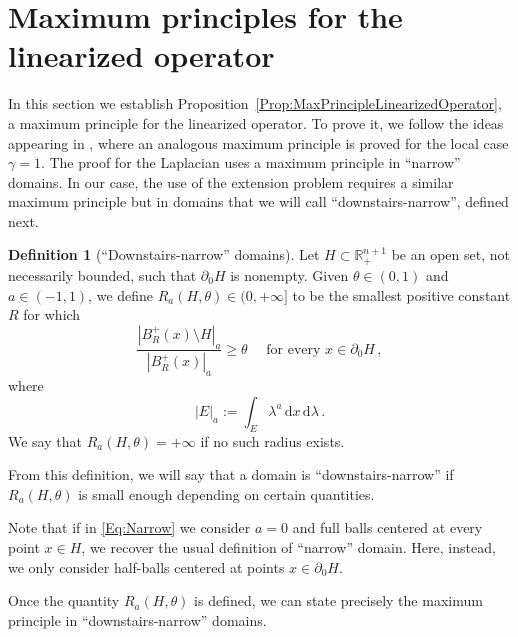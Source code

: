 \documentclass[12pt,reqno]{amsart}
\theoremstyle{definition}
\newtheorem{definition}[theorem]{Definition}
\theoremstyle{remark}
\newcommand{\con}[1]{\mathbb{#1}}
\newcommand{\R}{\con{R}} %
\newcommand{\s}{\gamma}
\renewcommand{\d}{\,\mathrm{d}} %
\newcommand{\dx}{\,\mathrm{d}x} %
\numberwithin{equation}{section}
\begin{document}
\section{Maximum principles for the linearized operator}
\label{Sec:MaximumPrinciple}

In this section we establish Proposition~\ref{Prop:MaxPrincipleLinearizedOperator}, a maximum principle for the linearized operator. To prove it, we follow the ideas appearing in \cite{Cabre-Saddle}, where an analogous maximum principle is proved for the local case $\s = 1$. The proof for the Laplacian uses a maximum principle in ``narrow'' domains. In our case, the use of the extension problem requires a similar maximum principle but in domains that we will call ``downstairs-narrow''\!, defined next.

\begin{definition}[``Downstairs-narrow'' domains]
Let $H \subset \R^{n+1}_+$ be an open set, not necessarily bounded, such that $\partial_0 H$ is nonempty. Given $\theta \in (0,1)$ and $a\in (-1,1)$, we define $R_a(H,\theta) \in (0, +\infty]$ to be the smallest positive constant $R$ for which
\begin{equation}
\label{Eq:Narrow}
\dfrac{|B^+_R(x)\setminus H|_a}{|B^+_R(x)|_a} \geq \theta \quad \text{ for every } x \in \partial_0 H\,,
\end{equation}
where 
$$
|E|_a := \int_E \lambda^a \dx \d \lambda\,.
$$
We say that $R_a(H,\theta) = + \infty$ if no such radius exists.

From this definition, we will say that a domain is ``downstairs-narrow'' if $R_a(H,\theta)$ is small enough depending on certain quantities.
\end{definition}

Note that if in \eqref{Eq:Narrow} we consider $a=0$ and full balls centered at every point $x\in H$, we recover the usual definition of ``narrow'' domain. Here, instead, we only consider half-balls centered at points $x\in \partial_0H$.

Once the quantity  $R_a(H,\theta)$ is defined, we can state precisely the maximum principle in ``downstairs-narrow'' domains.
\end{document}
